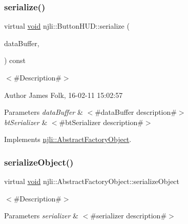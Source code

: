 \subsubsection{\texorpdfstring{serialize()}{serialize()}}
{\footnotesize\ttfamily virtual \mbox{\hyperlink{_thread_8h_af1e856da2e658414cb2456cb6f7ebc66}{void}} njli\+::\+Button\+H\+U\+D\+::serialize (\begin{DoxyParamCaption}\item[{\mbox{\hyperlink{_thread_8h_af1e856da2e658414cb2456cb6f7ebc66}{void}} $\ast$}]{data\+Buffer,  }\item[{bt\+Serializer $\ast$}]{ }\end{DoxyParamCaption}) const\hspace{0.3cm}{\ttfamily [virtual]}}



$<$\#\+Description\#$>$ 

\begin{DoxyAuthor}{Author}
James Folk, 16-\/02-\/11 15\+:02\+:57
\end{DoxyAuthor}

\begin{DoxyParams}{Parameters}
{\em data\+Buffer} & $<$\#data\+Buffer description\#$>$ \\
\hline
{\em bt\+Serializer} & $<$\#bt\+Serializer description\#$>$ \\
\hline
\end{DoxyParams}


Implements \mbox{\hyperlink{classnjli_1_1_abstract_factory_object_aad2fbe86fb3bdecf02918a96b9c57976}{njli\+::\+Abstract\+Factory\+Object}}.

\mbox{\label{classnjli_1_1_button_h_u_d_a4fc4bcd9d1930911474210c047372fc0}} 
\subsubsection{\texorpdfstring{serialize\+Object()}{serializeObject()}}
{\footnotesize\ttfamily virtual \mbox{\hyperlink{_thread_8h_af1e856da2e658414cb2456cb6f7ebc66}{void}} njli\+::\+Abstract\+Factory\+Object\+::serialize\+Object}

$<$\#\+Description\#$>$


\begin{DoxyParams}{Parameters}
{\em serializer} & $<$\#serializer description\#$>$ \\
\hline
\end{DoxyParams}
\mbox{\label{classnjli_1_1_button_h_u_d_aaf91ad4aac85500c011a9b0bd658dc7f}} 
